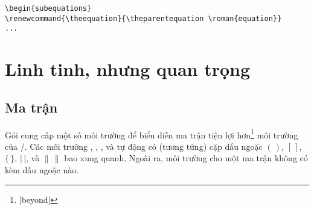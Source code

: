 \documentclass[11pt,leqno,titlepage,openany]{amsldoc}[1999/12/13]
\begin{document}
\medskip
\begin{verbatim}
\begin{subequations}
\renewcommand{\theequation}{\theparentequation \roman{equation}}
...
\end{verbatim}


\chapter{Linh tinh, nhưng quan trọng}

\section{Ma trận}\label{ss:matrix}

Gói  cung cấp một số môi trường để biểu diễn ma trận
tiện lợi hơn\footnote{|beyond|} môi trường  của \latex/.
Các môi trường , , , 
và  tự động có (tương tứng) cặp dấu ngoặc $(\,)$, $[\,]$,
$\lbrace\,\rbrace$,
$\lvert\,\rvert$, và $\lVert\,\rVert$ bao xung quanh.
Ngoài ra, môi trường  cho một ma trận không có kèm dấu ngoặc nào.
\end{document}
